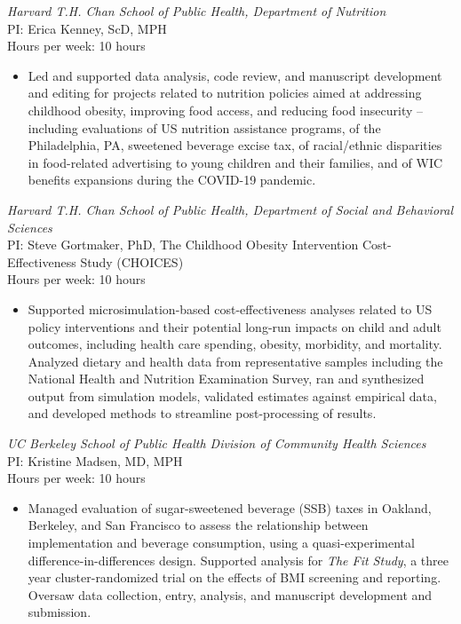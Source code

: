 \documentclass{cv_style}
\begin{document}
\textit{Harvard T.H. Chan School of Public Health, Department of Nutrition} \\
PI: Erica Kenney, ScD, MPH \\
Hours per week: 10 hours
\begin{itemize}
    \item Led and supported data analysis, code review, and manuscript development and editing for projects related to nutrition policies aimed at addressing childhood obesity, improving food access, and reducing food insecurity -- including evaluations of US nutrition assistance programs, of the Philadelphia, PA, sweetened beverage excise tax, of racial/ethnic disparities in food-related advertising to young children and their families, and of WIC benefits expansions during the COVID-19 pandemic.
\end{itemize}

\textit{Harvard T.H. Chan School of Public Health, Department of Social and Behavioral Sciences} \\
PI: Steve Gortmaker, PhD, The Childhood Obesity Intervention Cost-Effectiveness Study (CHOICES)\\
Hours per week: 10 hours
\begin{itemize}
    \item Supported microsimulation-based cost-effectiveness analyses related to US policy interventions and their potential long-run impacts on child and adult outcomes, including health care spending, obesity, morbidity, and mortality. Analyzed dietary and health data from representative samples including the National Health and Nutrition Examination Survey, ran and synthesized output from simulation models, validated estimates against empirical data, and developed methods to streamline post-processing of results.
\end{itemize}

\textit{UC Berkeley School of Public Health Division of Community Health Sciences} \\
PI: Kristine Madsen, MD, MPH\\
Hours per week: 10 hours
\begin{itemize}
    \item Managed evaluation of sugar-sweetened beverage (SSB) taxes in Oakland, Berkeley, and San Francisco to assess the relationship between implementation and beverage consumption, using a quasi-experimental difference-in-differences design. Supported analysis for \textit{The Fit Study}, a three year cluster-randomized trial on the effects of BMI screening and reporting. Oversaw data collection, entry, analysis, and manuscript development and submission.
\end{itemize}
\end{document}
